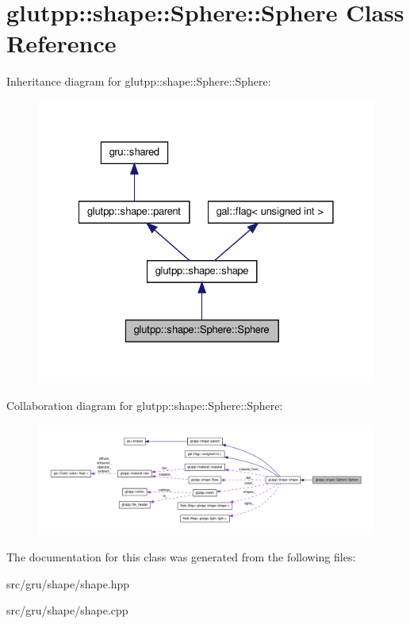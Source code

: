 \hypertarget{classglutpp_1_1shape_1_1Sphere_1_1Sphere}{\section{glutpp\-:\-:shape\-:\-:\-Sphere\-:\-:\-Sphere \-Class \-Reference}
\label{classglutpp_1_1shape_1_1Sphere_1_1Sphere}
}


\-Inheritance diagram for glutpp\-:\-:shape\-:\-:\-Sphere\-:\-:\-Sphere\-:
\nopagebreak
\begin{figure}[H]
\begin{center}
\leavevmode
\includegraphics[width=328pt]{classglutpp_1_1shape_1_1Sphere_1_1Sphere__inherit__graph}
\end{center}
\end{figure}


\-Collaboration diagram for glutpp\-:\-:shape\-:\-:\-Sphere\-:\-:\-Sphere\-:
\nopagebreak
\begin{figure}[H]
\begin{center}
\leavevmode
\includegraphics[width=350pt]{classglutpp_1_1shape_1_1Sphere_1_1Sphere__coll__graph}
\end{center}
\end{figure}


\-The documentation for this class was generated from the following files\-:\begin{DoxyCompactItemize}
\item 
src/gru/shape/shape.\-hpp\item 
src/gru/shape/shape.\-cpp\end{DoxyCompactItemize}
